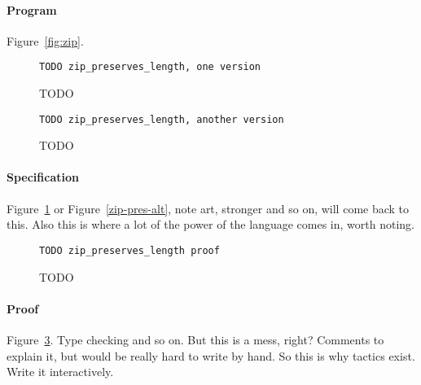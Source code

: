 \paragraph{Program} Figure~\ref{fig:zip}.

\begin{figure}
\begin{lstlisting}
TODO zip_preserves_length, one version
\end{lstlisting}
\caption{TODO}
\label{fig:zip-pres}
\end{figure}

\begin{figure}
\begin{lstlisting}
TODO zip_preserves_length, another version
\end{lstlisting}
\caption{TODO}
\label{fig:zip-pres-alt}
\end{figure}

\paragraph{Specification} Figure~\ref{fig:zip-pres} or Figure~\ref{zip-pres-alt}, note art, stronger and so on, will come back to this.
Also this is where a lot of the power of the language comes in, worth noting.

\begin{figure}
\begin{lstlisting}
TODO zip_preserves_length proof
\end{lstlisting}
\caption{TODO}
\label{fig:zip-pres-proof}
\end{figure}

\paragraph{Proof} Figure~\ref{fig:zip-pres-proof}. Type checking and so on. But this is a mess, right?
Comments to explain it, but would be really hard to write by hand.
So this is why tactics exist.
Write it interactively.


